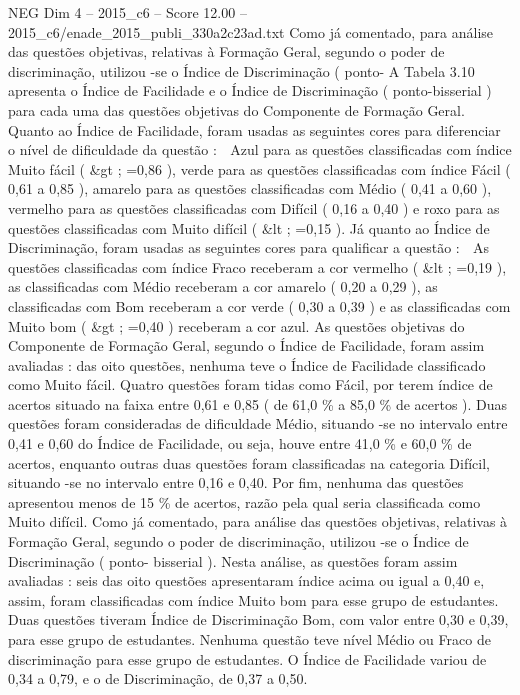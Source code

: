 \begin{textsample}{NEG Dim 4 – 2015\_c6 – Score 12.00 – 2015\_c6/enade\_2015\_publi\_330a2c23ad.txt}
Como já comentado, para análise das questões objetivas, relativas à Formação Geral, segundo o poder de discriminação, utilizou -se o Índice de Discriminação ( ponto- A Tabela 3.10 apresenta o Índice de Facilidade e o Índice de Discriminação ( ponto-bisserial ) para cada uma das questões objetivas do Componente de Formação Geral.
Quanto ao Índice de Facilidade, foram usadas as seguintes cores para diferenciar o nível de dificuldade da questão :  Azul para as questões classificadas com índice Muito fácil ( \&gt ; =0,86 ), verde para as questões classificadas com índice Fácil ( 0,61 a 0,85 ), amarelo para as questões classificadas com Médio ( 0,41 a 0,60 ), vermelho para as questões classificadas com Difícil ( 0,16 a 0,40 ) e roxo para as questões classificadas com Muito difícil ( \&lt ; =0,15 ).
Já quanto ao Índice de Discriminação, foram usadas as seguintes cores para qualificar a questão :  As questões classificadas com índice Fraco receberam a cor vermelho ( \&lt ; =0,19 ), as classificadas com Médio receberam a cor amarelo ( 0,20 a 0,29 ), as classificadas com Bom receberam a cor verde ( 0,30 a 0,39 ) e as classificadas com Muito bom ( \&gt ; =0,40 ) receberam a cor azul.
As questões objetivas do Componente de Formação Geral, segundo o Índice de Facilidade, foram assim avaliadas : das oito questões, nenhuma teve o Índice de Facilidade classificado como Muito fácil.
Quatro questões foram tidas como Fácil, por terem índice de acertos situado na faixa entre 0,61 e 0,85 ( de 61,0 \% a 85,0 \% de acertos ).
Duas questões foram consideradas de dificuldade Médio, situando -se no intervalo entre 0,41 e 0,60 do Índice de Facilidade, ou seja, houve entre 41,0 \% e 60,0 \% de acertos, enquanto outras duas questões foram classificadas na categoria Difícil, situando -se no intervalo entre 0,16 e 0,40.
Por fim, nenhuma das questões apresentou menos de 15 \% de acertos, razão pela qual seria classificada como Muito difícil.
Como já comentado, para análise das questões objetivas, relativas à Formação Geral, segundo o poder de discriminação, utilizou -se o Índice de Discriminação ( ponto- bisserial ).
Nesta análise, as questões foram assim avaliadas : seis das oito questões apresentaram índice acima ou igual a 0,40 e, assim, foram classificadas com índice Muito bom para esse grupo de estudantes.
Duas questões tiveram Índice de Discriminação Bom, com valor entre 0,30 e 0,39, para esse grupo de estudantes.
Nenhuma questão teve nível Médio ou Fraco de discriminação para esse grupo de estudantes.
O Índice de Facilidade variou de 0,34 a 0,79, e o de Discriminação, de 0,37 a 0,50.

\end{textsample}
